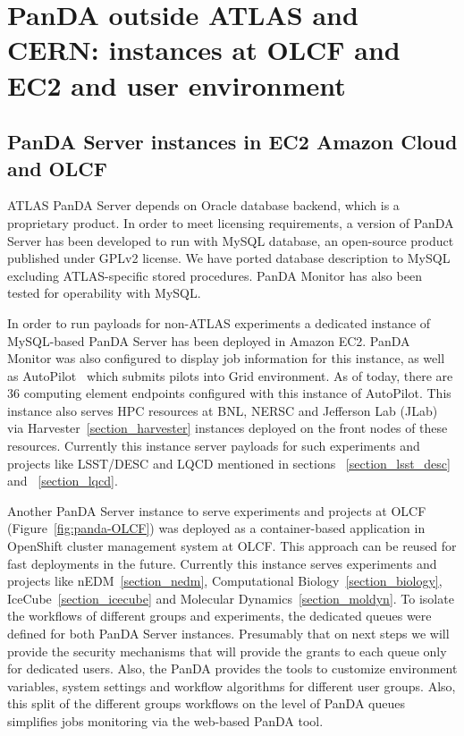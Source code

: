 \documentclass{webofc}
\begin{document}
\section{PanDA outside ATLAS and CERN: instances at OLCF and EC2 and user environment}

\subsection{PanDA Server instances in EC2 Amazon Cloud and OLCF}


ATLAS PanDA Server depends on Oracle database backend, which is a proprietary product. In order to meet licensing requirements, a version of PanDA Server has been developed to run with MySQL database, an open-source product published under GPLv2 license.  We have ported database description to MySQL excluding ATLAS-specific stored procedures. PanDA Monitor has also been tested for operability with MySQL.

In order to run payloads for non-ATLAS experiments a dedicated instance of MySQL-based PanDA Server has been deployed in Amazon EC2.  PanDA Monitor was also configured to display job information for this instance, as well as AutoPilot~\cite{PanDAPilotSubmission} which submits pilots into Grid environment. As of today, there are 36 computing element endpoints configured with this instance of AutoPilot. This instance also serves HPC resources at BNL, NERSC and Jefferson Lab (JLab) via Harvester~\ref{section_harvester} instances deployed on the front nodes of these resources. Currently this instance server payloads for such experiments and projects like LSST/DESC and LQCD mentioned in sections ~\ref{section_lsst_desc} and ~\ref{section_lqcd}.

Another  PanDA Server instance to serve experiments and projects at OLCF (Figure~\ref{fig:panda-OLCF}) was deployed as a container-based application in OpenShift cluster management system at OLCF. This approach can be reused for fast deployments in the future. Currently this instance serves experiments and projects like nEDM~\ref{section_nedm}, Computational Biology~\ref{section_biology}, IceCube~\ref{section_icecube} and Molecular Dynamics~\ref{section_moldyn}.
To isolate the workflows of different groups and experiments, the dedicated queues were defined for both PanDA Server instances. Presumably that on next steps we will provide the security mechanisms that will provide the grants to each queue only for dedicated users. Also, the PanDA provides the tools to customize environment variables, system settings and workflow algorithms for different user groups. Also, this split of the different groups workflows on the level of PanDA queues simplifies jobs monitoring via the web-based PanDA tool. 
\end{document}
